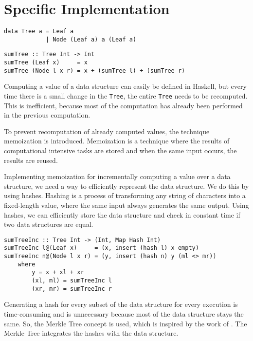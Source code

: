 \chapter{Specific Implementation}

\begin{verbatim}
data Tree a = Leaf a
            | Node (Leaf a) a (Leaf a)
\end{verbatim}

\begin{verbatim}
sumTree :: Tree Int -> Int
sumTree (Leaf x)     = x
sumTree (Node l x r) = x + (sumTree l) + (sumTree r)
\end{verbatim}

Computing a value of a data structure can easily be defined in Haskell, but every time there is a small change in the \texttt{Tree}, the entire \texttt{Tree} needs to be recomputed. This is inefficient, because most of the computation has already been performed in the previous computation. 

To prevent recomputation of already computed values, the technique memoization is introduced. Memoization is a technique where the results of computational intensive tasks are stored and when the same input occurs, the results are reused. 

Implementing memoization for incrementally computing a value over a data structure, we need a way to efficiently represent the data structure. We do this by using hashes. Hashing is a process of transforming any string of characters into a fixed-length value, where the same input always generates the same output. Using hashes, we can efficiently store the data structure and check in constant time if two data structures are equal.

\begin{verbatim}
sumTreeInc :: Tree Int -> (Int, Map Hash Int)
sumTreeInc l@(Leaf x)     = (x, insert (hash l) x empty)
sumTreeInc n@(Node l x r) = (y, insert (hash n) y (ml <> mr))
    where
        y = x + xl + xr
        (xl, ml) = sumTreeInc l
        (xr, mr) = sumTreeInc r
\end{verbatim}

Generating a hash for every subset of the data structure for every execution is time-consuming and is unnecessary because most of the data structure stays the same. So, the Merkle Tree concept is used, which is inspired by the work of \citeauthor{miraldo2019efficient}\cite{miraldo2019efficient}. The Merkle Tree integrates the hashes with the data structure.


